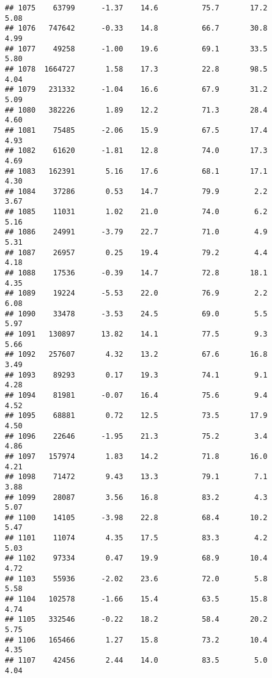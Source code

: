 \documentclass[
]{article}
\begin{document}
\begin{verbatim}
## 1075    63799      -1.37    14.6          75.7       17.2              5.08
## 1076   747642      -0.33    14.8          66.7       30.8              4.99
## 1077    49258      -1.00    19.6          69.1       33.5              5.80
## 1078  1664727       1.58    17.3          22.8       98.5              4.04
## 1079   231332      -1.04    16.6          67.9       31.2              5.09
## 1080   382226       1.89    12.2          71.3       28.4              4.60
## 1081    75485      -2.06    15.9          67.5       17.4              4.93
## 1082    61620      -1.81    12.8          74.0       17.3              4.69
## 1083   162391       5.16    17.6          68.1       17.1              4.30
## 1084    37286       0.53    14.7          79.9        2.2              3.67
## 1085    11031       1.02    21.0          74.0        6.2              5.16
## 1086    24991      -3.79    22.7          71.0        4.9              5.31
## 1087    26957       0.25    19.4          79.2        4.4              4.18
## 1088    17536      -0.39    14.7          72.8       18.1              4.35
## 1089    19224      -5.53    22.0          76.9        2.2              6.08
## 1090    33478      -3.53    24.5          69.0        5.5              5.97
## 1091   130897      13.82    14.1          77.5        9.3              5.66
## 1092   257607       4.32    13.2          67.6       16.8              3.49
## 1093    89293       0.17    19.3          74.1        9.1              4.28
## 1094    81981      -0.07    16.4          75.6        9.4              4.52
## 1095    68881       0.72    12.5          73.5       17.9              4.50
## 1096    22646      -1.95    21.3          75.2        3.4              4.86
## 1097   157974       1.83    14.2          71.8       16.0              4.21
## 1098    71472       9.43    13.3          79.1        7.1              3.88
## 1099    28087       3.56    16.8          83.2        4.3              5.07
## 1100    14105      -3.98    22.8          68.4       10.2              5.47
## 1101    11074       4.35    17.5          83.3        4.2              5.03
## 1102    97334       0.47    19.9          68.9       10.4              4.72
## 1103    55936      -2.02    23.6          72.0        5.8              5.58
## 1104   102578      -1.66    15.4          63.5       15.8              4.74
## 1105   332546      -0.22    18.2          58.4       20.2              5.75
## 1106   165466       1.27    15.8          73.2       10.4              4.35
## 1107    42456       2.44    14.0          83.5        5.0              4.04

\end{verbatim}
\end{document}
